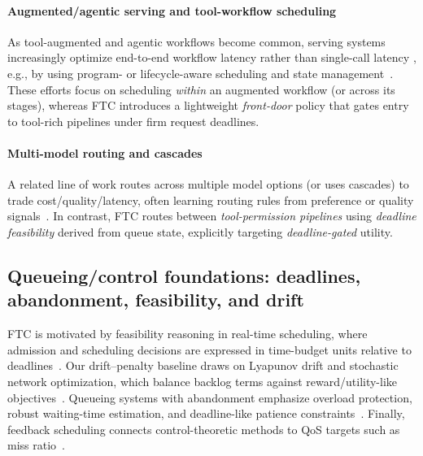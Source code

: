 \documentclass[preprint,12pt]{elsarticle}
\begin{document}
\paragraph{Augmented/agentic serving and tool-workflow scheduling}
As tool-augmented and agentic workflows become common, serving systems increasingly optimize end-to-end workflow latency rather than single-call latency \cite{285173}, e.g., by using program- or lifecycle-aware scheduling and state management~\cite{autellix2025,astraea2025,augserve2025}. These efforts focus on scheduling \emph{within} an augmented workflow (or across its stages), whereas FTC introduces a lightweight \emph{front-door} policy that gates entry to tool-rich pipelines under firm request deadlines.

\paragraph{Multi-model routing and cascades}
A related line of work routes across multiple model options (or uses cascades) to trade cost/quality/latency, often learning routing rules from preference or quality signals~\cite{chen2023frugalgpt,ong2024routellm,wang2025mixllm}. In contrast, FTC routes between \emph{tool-permission pipelines} using \emph{deadline feasibility} derived from queue state, explicitly targeting \emph{deadline-gated} utility.

\subsection{Queueing/control foundations: deadlines, abandonment, feasibility, and drift}
FTC is motivated by feasibility reasoning in real-time scheduling, where admission and scheduling decisions are expressed in time-budget units relative to deadlines~\cite{liu1973scheduling,lopez2004edfmp}. Our drift--penalty baseline draws on Lyapunov drift and stochastic network optimization, which balance backlog terms against reward/utility-like objectives~\cite{neely2010stochastic}. Queueing systems with abandonment emphasize overload protection, robust waiting-time estimation, and deadline-like patience constraints~\cite{whitt2006fluid, ibrahim2009delay, abandonmentra}. Finally, feedback scheduling connects control-theoretic methods to QoS targets such as miss ratio~\cite{lu1999case,lu2001feedback,hellerstein2004feedback}.
\end{document}
